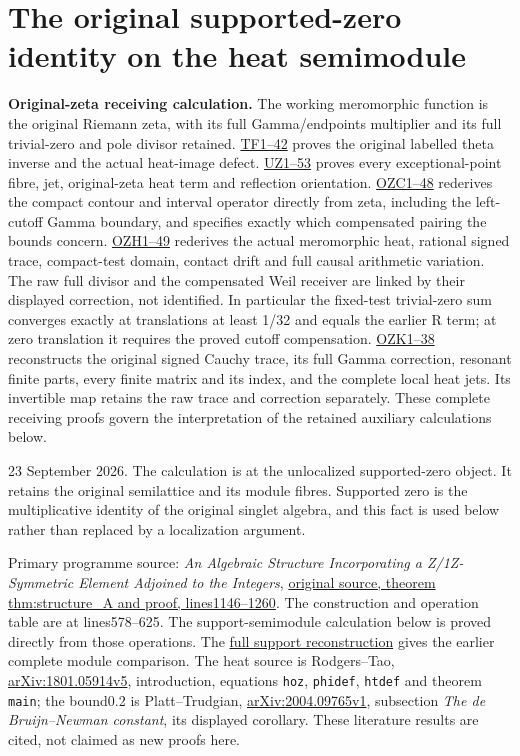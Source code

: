 \documentclass[
  10pt,
  a4paper,
]{article}
\author{}
\date{}
\begin{document}
{
\setcounter{tocdepth}{3}
\tableofcontents
}
\section{The original supported-zero identity on the heat
semimodule}\label{the-original-supported-zero-identity-on-the-heat-semimodule}

\textbf{Original-zeta receiving calculation.} The working meromorphic
function is the original Riemann zeta, with its full Gamma/endpoints
multiplier and its full trivial-zero and pole divisor retained.
\href{FAITHFUL_THETA_COMPLETION_RETURN.md}{TF1--42} proves the original
labelled theta inverse and the actual heat-image defect.
\href{FAITHFUL_UNCOMPLETED_ZETA_HEAT.md}{UZ1--53} proves every
exceptional-point fibre, jet, original-zeta heat term and reflection
orientation.
\href{ORIGINAL_ZETA_COMPACT_WEIL_RECONSTRUCTION.md}{OZC1--48} rederives
the compact contour and interval operator directly from zeta, including
the left-cutoff Gamma boundary, and specifies exactly which compensated
pairing the bounds concern.
\href{ORIGINAL_ZETA_HEAT_CONTACT_RECONSTRUCTION.md}{OZH1--49} rederives
the actual meromorphic heat, rational signed trace, compact-test domain,
contact drift and full causal arithmetic variation. The raw full divisor
and the compensated Weil receiver are linked by their displayed
correction, not identified. In particular the fixed-test trivial-zero
sum converges exactly at translations at least 1/32 and equals the
earlier R term; at zero translation it requires the proved cutoff
compensation. \href{ORIGINAL_ZETA_CAUCHY_RECONSTRUCTION.md}{OZK1--38}
reconstructs the original signed Cauchy trace, its full Gamma
correction, resonant finite parts, every finite matrix and its index,
and the complete local heat jets. Its invertible map retains the raw
trace and correction separately. These complete receiving proofs govern
the interpretation of the retained auxiliary calculations below.

23 September 2026. The calculation is at the unlocalized supported-zero
object. It retains the original semilattice and its module fibres.
Supported zero is the multiplicative identity of the original singlet
algebra, and this fact is used below rather than replaced by a
localization argument.

Primary programme source: \emph{An Algebraic Structure Incorporating a
Z/1Z-Symmetric Element Adjoined to the Integers},
\href{supporting_sources/17555345_11.tex\#L1146}{original source,
theorem thm:structure\_A and proof, lines1146--1260}. The construction
and operation table are at lines578--625. The support-semimodule
calculation below is proved directly from those operations. The
\href{FULL_SUPPORT_RECONSTRUCTION_DERIVATION.md}{full support
reconstruction} gives the earlier complete module comparison. The heat
source is Rodgers--Tao,
\href{https://arxiv.org/abs/1801.05914v5}{arXiv:1801.05914v5},
introduction, equations \texttt{hoz}, \texttt{phidef}, \texttt{htdef}
and theorem \texttt{main}; the bound0.2 is Platt--Trudgian,
\href{https://arxiv.org/abs/2004.09765v1}{arXiv:2004.09765v1},
subsection \emph{The de Bruijn--Newman constant}, its displayed
corollary. These literature results are cited, not claimed as new proofs
here.
\end{document}
